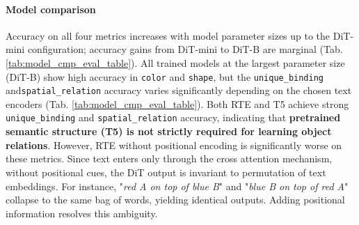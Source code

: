 \documentclass[10pt,twocolumn,letterpaper]{article}
\begin{document}
\paragraph{Model comparison} 
Accuracy on all four metrics increases with model parameter sizes up to the DiT-mini configuration; accuracy gains from DiT-mini to DiT-B are marginal (Tab. \ref{tab:model_cmp_eval_table}). All trained models at the largest parameter size (DiT-B) show high accuracy in \texttt{color} and \texttt{shape}, but the \texttt{unique\_binding} and\texttt{spatial\_relation} accuracy varies significantly depending on the chosen text encoders (Tab. \ref{tab:model_cmp_eval_table}). %
Both RTE and T5 achieve strong \texttt{unique\_binding} and \texttt{spatial\_relation} accuracy, indicating that \textbf{pretrained semantic structure (T5) is not strictly required for learning object relations}. 
However, RTE without positional encoding is significantly worse on these metrics. %
Since text enters only through the cross attention mechanism, without positional cues, the DiT output is invariant to permutation of text embeddings. For instance, "\textit{red A on top of blue B}" and "\textit{blue B on top of red A}" collapse to the same bag of words, yielding identical outputs. Adding positional information resolves this ambiguity.

 
\end{document}
